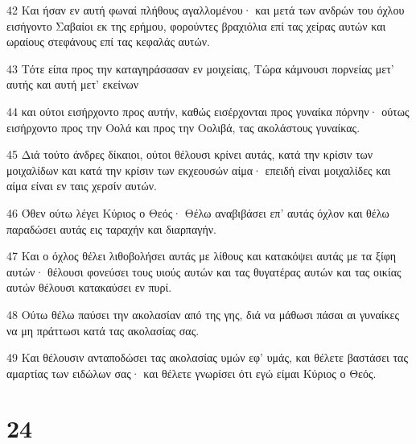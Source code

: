 \par 42 Και ήσαν εν αυτή φωναί πλήθους αγαλλομένου· και μετά των ανδρών του όχλου εισήγοντο Σαβαίοι εκ της ερήμου, φορούντες βραχιόλια επί τας χείρας αυτών και ωραίους στεφάνους επί τας κεφαλάς αυτών.
\par 43 Τότε είπα προς την καταγηράσασαν εν μοιχείαις, Τώρα κάμνουσι πορνείας μετ' αυτής και αυτή μετ' εκείνων
\par 44 και ούτοι εισήρχοντο προς αυτήν, καθώς εισέρχονται προς γυναίκα πόρνην· ούτως εισήρχοντο προς την Οολά και προς την Οολιβά, τας ακολάστους γυναίκας.
\par 45 Διά τούτο άνδρες δίκαιοι, ούτοι θέλουσι κρίνει αυτάς, κατά την κρίσιν των μοιχαλίδων και κατά την κρίσιν των εκχεουσών αίμα· επειδή είναι μοιχαλίδες και αίμα είναι εν ταις χερσίν αυτών.
\par 46 Όθεν ούτω λέγει Κύριος ο Θεός· Θέλω αναβιβάσει επ' αυτάς όχλον και θέλω παραδώσει αυτάς εις ταραχήν και διαρπαγήν.
\par 47 Και ο όχλος θέλει λιθοβολήσει αυτάς με λίθους και κατακόψει αυτάς με τα ξίφη αυτών· θέλουσι φονεύσει τους υιούς αυτών και τας θυγατέρας αυτών και τας οικίας αυτών θέλουσι κατακαύσει εν πυρί.
\par 48 Ούτω θέλω παύσει την ακολασίαν από της γης, διά να μάθωσι πάσαι αι γυναίκες να μη πράττωσι κατά τας ακολασίας σας.
\par 49 Και θέλουσιν ανταποδώσει τας ακολασίας υμών εφ' υμάς, και θέλετε βαστάσει τας αμαρτίας των ειδώλων σας· και θέλετε γνωρίσει ότι εγώ είμαι Κύριος ο Θεός.

\chapter{24}

